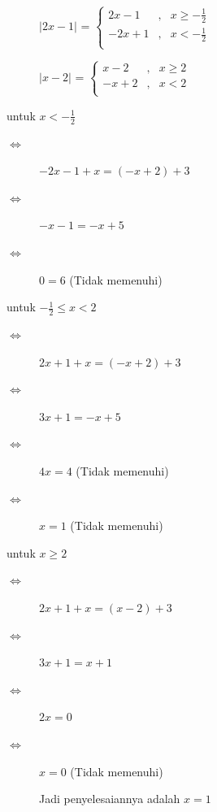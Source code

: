 \documentclass{article}
\begin{document}
\begin{description}
    \begin{description}
        \item[] $|2x-1|$ =  $\left\{ \begin{array}{rcl}
        2x-1 & \mbox{,} & x \geq -\frac{1}{2} \\ 
        -2x+1 & \mbox{,} & x < -\frac{1}{2} \\
        \end{array}\right.$
        \item[] $|x-2|$ =  $\left\{ \begin{array}{rcl}
        x-2 & \mbox{,} & x \geq 2 \\ 
        -x+2 & \mbox{,} & x < 2 \\
        \end{array}\right.$ \\
    \end{description}

    untuk $x < -\frac{1}{2}$
    \begin{description}
        \item[$\Leftrightarrow$] $-2x-1+x = (-x+2) + 3$ 
        \item[$\Leftrightarrow$] $-x-1 = -x+5$ 
        \item[$\Leftrightarrow$] $0 = 6$ (Tidak memenuhi)
    \end{description}
    untuk $-\frac{1}{2} \leq x < 2$
    \begin{description}
        \item[$\Leftrightarrow$] $2x+1+x = (-x+2) + 3$ 
        \item[$\Leftrightarrow$] $3x+1= -x + 5$ 
        \item[$\Leftrightarrow$] $4x= 4$ (Tidak memenuhi)
        \item[$\Leftrightarrow$] $x= 1$ (Tidak memenuhi)
    \end{description}
    untuk $x \geq 2$ \\ 
    \begin{description}
        \item[$\Leftrightarrow$] $2x+1+x = (x-2)+3$ 
        \item[$\Leftrightarrow$] $3x+1= x+1$ 
        \item[$\Leftrightarrow$] $2x= 0$
        \item[$\Leftrightarrow$] $x= 0$ (Tidak memenuhi)
        \item[] Jadi penyelesaiannya adalah $x = 1$ 
    \end{description}


\end{description}
\end{document}
